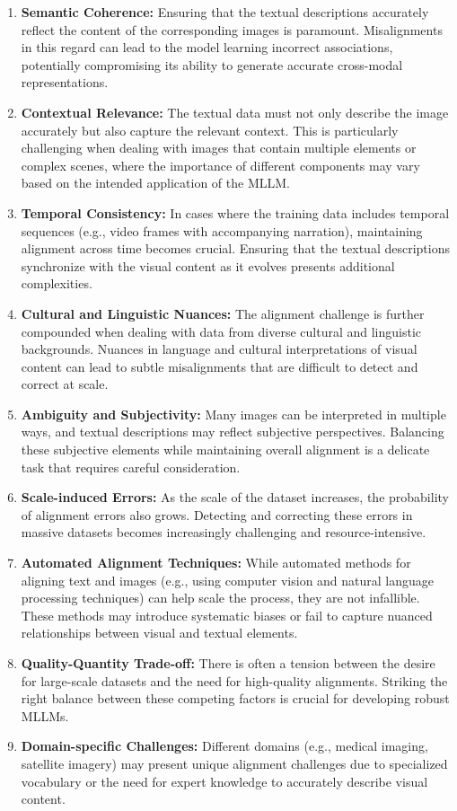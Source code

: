 \begin{enumerate}
    \item \textbf{Semantic Coherence:} Ensuring that the textual descriptions accurately reflect the content of the corresponding images is paramount. Misalignments in this regard can lead to the model learning incorrect associations, potentially compromising its ability to generate accurate cross-modal representations.
    \item \textbf{Contextual Relevance:} The textual data must not only describe the image accurately but also capture the relevant context. This is particularly challenging when dealing with images that contain multiple elements or complex scenes, where the importance of different components may vary based on the intended application of the MLLM.
    \item \textbf{Temporal Consistency:} In cases where the training data includes temporal sequences (e.g., video frames with accompanying narration), maintaining alignment across time becomes crucial. Ensuring that the textual descriptions synchronize with the visual content as it evolves presents additional complexities.
    \item \textbf{Cultural and Linguistic Nuances:} The alignment challenge is further compounded when dealing with data from diverse cultural and linguistic backgrounds. Nuances in language and cultural interpretations of visual content can lead to subtle misalignments that are difficult to detect and correct at scale.
    \item \textbf{Ambiguity and Subjectivity:} Many images can be interpreted in multiple ways, and textual descriptions may reflect subjective perspectives. Balancing these subjective elements while maintaining overall alignment is a delicate task that requires careful consideration.
    \item \textbf{Scale-induced Errors:} As the scale of the dataset increases, the probability of alignment errors also grows. Detecting and correcting these errors in massive datasets becomes increasingly challenging and resource-intensive.
    \item \textbf{Automated Alignment Techniques:} While automated methods for aligning text and images (e.g., using computer vision and natural language processing techniques) can help scale the process, they are not infallible. These methods may introduce systematic biases or fail to capture nuanced relationships between visual and textual elements.
    \item \textbf{Quality-Quantity Trade-off:} There is often a tension between the desire for large-scale datasets and the need for high-quality alignments. Striking the right balance between these competing factors is crucial for developing robust MLLMs.
    \item \textbf{Domain-specific Challenges:} Different domains (e.g., medical imaging, satellite imagery) may present unique alignment challenges due to specialized vocabulary or the need for expert knowledge to accurately describe visual content.
\end{enumerate}


